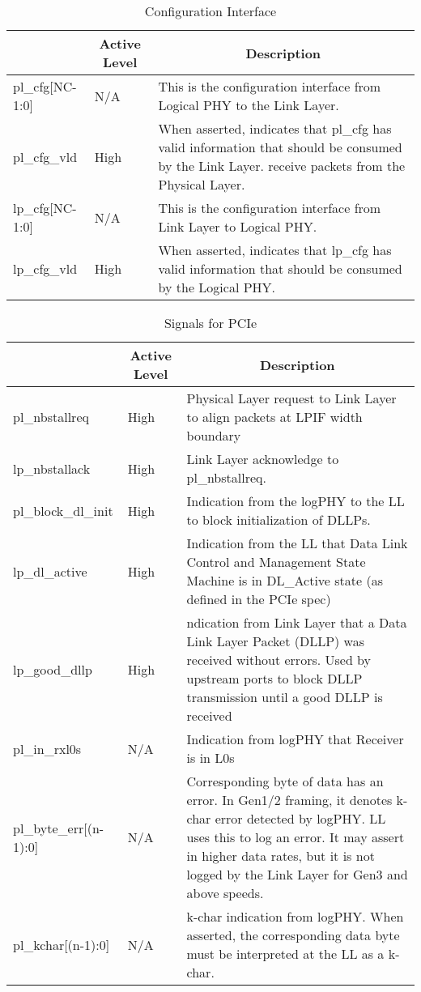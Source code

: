 \begin{table}[H]
    \caption{Configuration Interface}
    \centering
  \begin{tabular}{ |m{26mm}|m{10mm}|m{60mm}|  }
\hline
\rowcolor{Gray}
\multicolumn{1}{|c|}{\textbf{Name} } 
& \multicolumn{1}{|c|}{\textbf{Active Level}} 
& \multicolumn{1}{|c|}{\textbf{Description}}\\
\hline
pl\_cfg[NC-1:0] & N/A & This is the configuration interface from Logical PHY to the Link Layer. \\ \hline
pl\_cfg\_vld & High & When asserted, indicates that pl\_cfg has valid information that should be
consumed by the Link Layer.
receive packets from the Physical Layer. \\ \hline
lp\_cfg[NC-1:0] & N/A & This is the configuration interface from Link Layer to Logical PHY.\\ \hline
lp\_cfg\_vld & High &When asserted, indicates that lp\_cfg has valid information that should be
consumed by the Logical PHY. \\ \hline
\end{tabular}
\end{table}

\begin{table}[H]
    \caption{Signals for PCIe}
    \centering
  \begin{tabular}{ |m{26mm}|m{10mm}|m{60mm}|  }
\hline
\rowcolor{Gray}
\multicolumn{1}{|c|}{\textbf{Name} } 
& \multicolumn{1}{|c|}{\textbf{Active Level}} 
& \multicolumn{1}{|c|}{\textbf{Description}}\\
\hline
pl\_nbstallreq& High &Physical Layer request to Link Layer to align packets at LPIF width boundary \\ \hline 
lp\_nbstallack& High & Link Layer acknowledge to pl\_nbstallreq.\\ \hline 

pl\_block\_dl\_init &High & Indication from the logPHY to the LL to block initialization of DLLPs.\\ \hline 
lp\_dl\_active &High & Indication from the LL that Data Link Control and Management State Machine is in
DL\_Active state (as defined in the PCIe spec)\\ \hline 
lp\_good\_dllp &High & ndication from Link Layer that a Data Link Layer Packet (DLLP) was received without errors. Used by upstream ports to block DLLP transmission until a good DLLP is received\\ \hline 
pl\_in\_rxl0s & N/A& Indication from logPHY that Receiver is in L0s\\ \hline 
pl\_byte\_err[(n-1):0] &N/A & Corresponding byte of data has an error. In Gen1/2 framing, it denotes k-char error 
detected by logPHY. LL uses this to log an error. It may assert in higher data rates, but it
is not logged by the Link Layer for Gen3 and above speeds.\\ \hline 

pl\_kchar[(n-1):0] &N/A & k-char indication from logPHY. When asserted, the corresponding data byte must be
interpreted at the LL as a k-char.\\ \hline 

\end{tabular}
\end{table}

